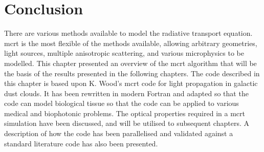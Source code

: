 \section{Conclusion}

There are various methods available to model the radiative transport equation.
\Gls*{mcrt} is the most flexible of the methods available, allowing arbitrary geometries, light sources, multiple anisotropic scattering, and various microphysics to be modelled.
This chapter presented an overview of the \gls*{mcrt} algorithm that will be the basis of the results presented in the following chapters.
The code described in this chapter is based upon K. Wood's \gls*{mcrt} code for light propagation in galactic dust clouds.
It has been rewritten in modern Fortran and adapted so that the code can model biological tissue so that the code can be applied to various medical and biophotonic problems.
The optical properties required in a \gls*{mcrt} simulation have been discussed, and will be utilised to subsequent chapters.
A description of how the code has been parallelised and validated against a standard literature code has also been presented.
